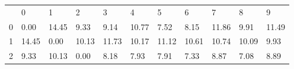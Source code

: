 \documentclass{article}
\begin{document}
\begin{table}[H]
	\centering
	\label{my-label}
	\begin{tabular}{lllllllllll}
		                      & 0                                                 & 1                                                 & 2                                                 & 3                                                 & 4                                                 & 5                                                 & 6                                                 & 7                                                 & 8                                                 & 9                                                 \\ \cline{2-11} 
		\multicolumn{1}{l|}{0} & \multicolumn{1}{l|}{\cellcolor[HTML]{C0C0C0}0.00} & \multicolumn{1}{l|}{14.45}                        & \multicolumn{1}{l|}{9.33}                         & \multicolumn{1}{l|}{9.14}                         & \multicolumn{1}{l|}{10.77}                        & \multicolumn{1}{l|}{7.52}                         & \multicolumn{1}{l|}{8.15}                         & \multicolumn{1}{l|}{11.86}                        & \multicolumn{1}{l|}{9.91}                         & \multicolumn{1}{l|}{11.49}                        \\ \cline{2-11} 
		\multicolumn{1}{l|}{1} & \multicolumn{1}{l|}{14.45}                        & \multicolumn{1}{l|}{\cellcolor[HTML]{C0C0C0}0.00} & \multicolumn{1}{l|}{10.13}                        & \multicolumn{1}{l|}{11.73}                        & \multicolumn{1}{l|}{10.17}                        & \multicolumn{1}{l|}{11.12}                        & \multicolumn{1}{l|}{10.61}                        & \multicolumn{1}{l|}{10.74}                        & \multicolumn{1}{l|}{10.09}                        & \multicolumn{1}{l|}{9.93}                         \\ \cline{2-11} 
		\multicolumn{1}{l|}{2} & \multicolumn{1}{l|}{9.33}                         & \multicolumn{1}{l|}{10.13}                        & \multicolumn{1}{l|}{\cellcolor[HTML]{C0C0C0}0.00} & \multicolumn{1}{l|}{8.18}                         & \multicolumn{1}{l|}{7.93}                         & \multicolumn{1}{l|}{7.91}                         & \multicolumn{1}{l|}{7.33}                         & \multicolumn{1}{l|}{8.87}                         & \multicolumn{1}{l|}{7.08}                         & \multicolumn{1}{l|}{8.89}                         \\ \cline{2-11} 

\end{tabular}
\end{table}
\end{document}

